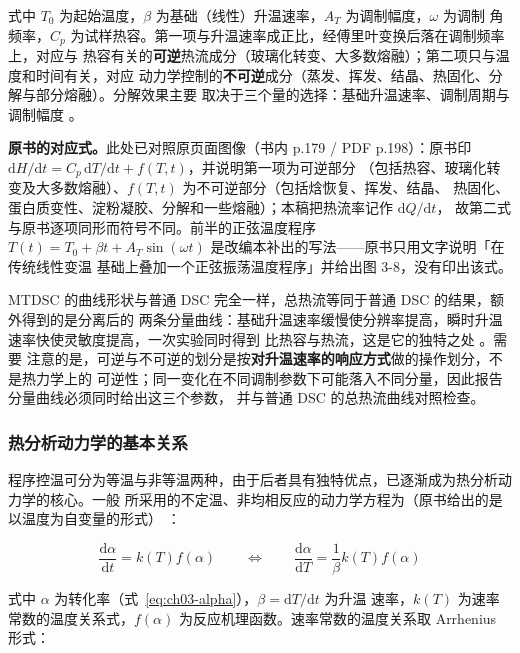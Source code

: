 式中 $T_0$ 为起始温度，$\beta$ 为基础（线性）升温速率，$A_T$ 为调制幅度，$\omega$ 为调制
角频率，$C_p$ 为试样热容。第一项与升温速率成正比，经傅里叶变换后落在调制频率上，对应与
热容有关的\textbf{可逆}热流成分（玻璃化转变、大多数熔融）；第二项只与温度和时间有关，对应
动力学控制的\textbf{不可逆}成分（蒸发、挥发、结晶、热固化、分解与部分熔融）。分解效果主要
取决于三个量的选择：基础升温速率、调制周期与调制幅度
。

\textbf{原书的对应式。}此处已对照原页面图像（书内 p.179 / PDF p.198）：原书印
$\mathrm{d}H/\mathrm{d}t=C_p\,\mathrm{d}T/\mathrm{d}t+f(T,t)$，并说明第一项为可逆部分
（包括热容、玻璃化转变及大多数熔融）、$f(T,t)$ 为不可逆部分（包括焓恢复、挥发、结晶、
热固化、蛋白质变性、淀粉凝胶、分解和一些熔融）；本稿把热流率记作 $\mathrm{d}Q/\mathrm{d}t$，
故第二式与原书逐项同形而符号不同。前半的正弦温度程序
$T(t)=T_0+\beta t+A_T\sin(\omega t)$ 是改编本补出的写法——原书只用文字说明「在传统线性变温
基础上叠加一个正弦振荡温度程序」并给出图 3-8，没有印出该式。

MTDSC 的曲线形状与普通 DSC 完全一样，总热流等同于普通 DSC 的结果，额外得到的是分离后的
两条分量曲线：基础升温速率缓慢使分辨率提高，瞬时升温速率快使灵敏度提高，一次实验同时得到
比热容与热流，这是它的独特之处 。需要
注意的是，可逆与不可逆的划分是按\textbf{对升温速率的响应方式}做的操作划分，不是热力学上的
可逆性；同一变化在不同调制参数下可能落入不同分量，因此报告分量曲线必须同时给出这三个参数，
并与普通 DSC 的总热流曲线对照检查。

\subsubsection{热分析动力学的基本关系}

程序控温可分为等温与非等温两种，由于后者具有独特优点，已逐渐成为热分析动力学的核心。一般
所采用的不定温、非均相反应的动力学方程为（原书给出的是以温度为自变量的形式）
：

\begin{equation}\label{eq:ch03-rate}
\frac{\mathrm{d}\alpha}{\mathrm{d}t}=k(T)f(\alpha)
\qquad\Longleftrightarrow\qquad
\frac{\mathrm{d}\alpha}{\mathrm{d}T}=\frac{1}{\beta}k(T)f(\alpha)
\end{equation}

式中 $\alpha$ 为转化率（式~\eqref{eq:ch03-alpha}），$\beta=\mathrm{d}T/\mathrm{d}t$ 为升温
速率，$k(T)$ 为速率常数的温度关系式，$f(\alpha)$ 为反应机理函数。速率常数的温度关系取
Arrhenius 形式：

